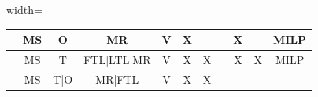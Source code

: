 \begin{table}[!ht]
\begin{adjustbox}{width=\textwidth}
\begin{tabular}{|c|c|c|c|c|c|c|l|c|c|c|}
      \autocite{Hein2016QuantitativeProblem}                                             &
      MS                                                                                 &
      O                                                                                  &
      MR                                                                                 &
      V                                                                                  &
      X                                                                                  &
                                                                                         &                &
      X                                                                                  &
                                                                                         &
      MILP                                                                                                                                              \\ \hline
      \autocite{Diaz-Madronero2017ADecisions}                                            &
      MS                                                                                 &
      T                                                                                  &
      FTL|LTL|MR                                                                         &
      V                                                                                  &
      X                                                                                  &
      X                                                                                  &                &
      X                                                                                  &
      X                                                                                  &
      MILP                                                                                                                                              \\ \hline
      \autocite{Meyer2018TransportIndustry}                                              & MS
                                                                                         & T|O
                                                                                         & MR|FTL
                                                                                         & V
                                                                                         & X
                                                                                         & X

\end{tabular}
\end{adjustbox}
\end{table}
